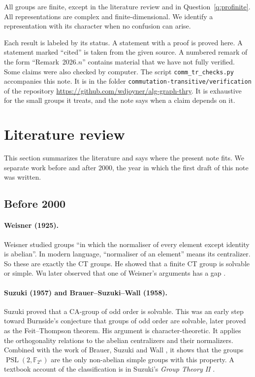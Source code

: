 \documentclass[12pt,letterpaper]{article}
\numberwithin{equation}{section}
\theoremstyle{plain}
\theoremstyle{definition}
\newcommand{\F}{\mathbb{F}}
\DeclareMathOperator{\PSL}{PSL}
\begin{document}
All groups are finite, except in the literature review and in
Question~\ref{q:profinite}. All
representations are complex and finite-dimensional. We identify a
representation with its character when no confusion can arise.

Each result is labeled by its status. A statement with a proof is proved
here. A statement marked ``cited'' is taken from the given source. A
numbered remark of the form ``Remark~2026.$n$'' contains material that we
have not fully verified. Some claims were also checked by computer. The script
\texttt{comm\_tr\_checks.py} accompanies this note. It is in the folder
\texttt{commutation-transitive/verification} of the repository
\url{https://github.com/wdjoyner/alg-graph-thry}. It is exhaustive for the
small groups it treats, and the note says when a claim depends on it.

\section{Literature review}\label{sec:lit}

This section summarizes the literature and says where the present note fits.
We separate work before and after 2000, the year in which the first draft of
this note was written.

\subsection{Before 2000}

\paragraph{Weisner (1925).} Weisner \cite{We25} studied groups ``in which
the normaliser of every element except identity is abelian''. In modern
language, ``normaliser of an element'' means its centralizer. So these are
exactly the CT groups. He showed that a finite CT group is solvable or
simple. Wu later observed that one of Weisner's arguments has a gap
\cite{Wu98}.

\paragraph{Suzuki (1957) and Brauer--Suzuki--Wall (1958).} Suzuki
\cite{Su57} proved that a CA-group of odd order is solvable. This was an
early step toward Burnside's conjecture that groups of odd order are
solvable, later proved as the Feit--Thompson theorem. His argument is character-theoretic. It applies the
orthogonality relations to the abelian centralizers and their
normalizers. Combined with the work of Brauer, Suzuki and Wall
\cite{BSW58}, it shows that the groups $\PSL(2,\F_{2^n})$ are the only
non-abelian simple groups with this property. A textbook account of the
classification is in Suzuki's \emph{Group Theory II} \cite{Su86}.
\end{document}
